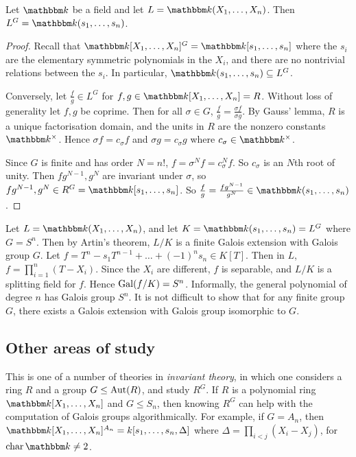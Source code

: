 \begin{theorem}
	Let \( \mathbbm k \) be a field and let \( L = \mathbbm k(X_1, \dots, X_n) \).
	Then \( L^G = \mathbbm k(s_1, \dots, s_n) \).
\end{theorem}
\begin{proof}
	Recall that \( \mathbbm k[X_1, \dots, X_n]^G = \mathbbm k[s_1, \dots, s_n] \) where the \( s_i \) are the elementary symmetric polynomials in the \( X_i \), and there are no nontrivial relations between the \( s_i \).
	In particular, \( \mathbbm k(s_1, \dots, s_n) \subseteq L^G \).

	Conversely, let \( \frac{f}{g} \in L^G \) for \( f, g \in \mathbbm k[X_1, \dots, X_n] = R \).
	Without loss of generality let \( f, g \) be coprime.
	Then for all \( \sigma \in G \), \( \frac{f}{g} = \frac{\sigma f}{\sigma g} \).
	By Gauss' lemma, \( R \) is a unique factorisation domain, and the units in \( R \) are the nonzero constants \( \mathbbm k^\times \).
	Hence \( \sigma f = c_\sigma f \) and \( \sigma g = c_\sigma g \) where \( c_\sigma \in \mathbbm k^\times \).

	Since \( G \) is finite and has order \( N = n! \), \( f = \sigma^N f = c_\sigma^N f \).
	So \( c_\sigma \) is an \( N \)th root of unity.
	Then \( fg^{N-1}, g^N \) are invariant under \( \sigma \), so \( fg^{N-1}, g^N \in R^G = \mathbbm k[s_1, \dots, s_n] \).
	So \( \frac{f}{g} = \frac{fg^{N-1}}{g^N} \in \mathbbm k(s_1, \dots, s_n) \).
\end{proof}
\begin{example}
	Let \( L = \mathbbm k(X_1, \dots, X_n) \), and let \( K = \mathbbm k(s_1, \dots, s_n) = L^G \) where \( G = S^n \).
	Then by Artin's theorem, \( L/K \) is a finite Galois extension with Galois group \( G \).
	Let \( f = T^n - s_1 T^{n-1} + \dots + (-1)^n s_n \in K[T] \).
	Then in \( L \), \( f = \prod_{i=1}^n (T - X_i) \).
	Since the \( X_i \) are different, \( f \) is separable, and \( L / K \) is a splitting field for \( f \).
	Hence \( \operatorname{Gal}(f/K) = S^n \).
	Informally, the general polynomial of degree \( n \) has Galois group \( S^n \).
	It is not difficult to show that for any finite group \( G \), there exists a Galois extension with Galois group isomorphic to \( G \).
\end{example}

\subsection{Other areas of study}
This is one of a number of theories in \emph{invariant theory}, in which one considers a ring \( R \) and a group \( G \leq \operatorname{Aut}(R) \), and study \( R^G \).
If \( R \) is a polynomial ring \( \mathbbm k[X_1, \dots, X_n] \) and \( G \leq S_n \), then knowing \( R^G \) can help with the computation of Galois groups algorithmically.
For example, if \( G = A_n \), then \( \mathbbm k[X_1, \dots, X_n]^{A_n} = k[s_1, \dots, s_n, \Delta] \) where \( \Delta = \prod_{i < j} (X_i - X_j) \), for \( \fchar \mathbbm k \neq 2 \).

